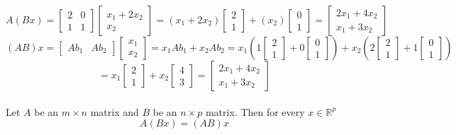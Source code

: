\[
  A(Bx) = \begin{bmatrix}
    2 & 0 \\
    1 & 1
  \end{bmatrix} \begin{bmatrix}
    x_1 + 2x_2 \\
    x_2
  \end{bmatrix} = (x_1 + 2x_2) \begin{bmatrix}
    2 \\ 1
  \end{bmatrix} + (x_2) \begin{bmatrix}
    0 \\ 1
  \end{bmatrix} = \begin{bmatrix}
    2x_1 + 4x_2 \\
    x_1 + 3x_2
  \end{bmatrix}
\]
\[
  (AB)x = \begin{bmatrix}
    Ab_1 & Ab_2
  \end{bmatrix} \begin{bmatrix}
    x_1 \\ x_2
  \end{bmatrix} = x_1Ab_1 + x_2Ab_2 = x_1(1\begin{bmatrix}
    2 \\ 1
  \end{bmatrix} + 0\begin{bmatrix}
    0 \\ 1
  \end{bmatrix}) + x_2(2 \begin{bmatrix}
    2 \\ 1
  \end{bmatrix} + 1 \begin{bmatrix}
    0 \\ 1
  \end{bmatrix}) 
\]
\[
= x_1 \begin{bmatrix}
    2 \\ 1
  \end{bmatrix} + x_2 \begin{bmatrix}
    4 \\ 3
  \end{bmatrix} = \begin{bmatrix}
    2x_1 + 4x_2 \\
    x_1 + 3x_2
  \end{bmatrix}
\]
\\[8pt]
Let $A$ be an $m \times n$ matrix and $B$ be an $n \times p$ matrix. Then for every $x \in \mathbb{R}^p$ 
\[
  A(Bx) = (AB)x
\]
